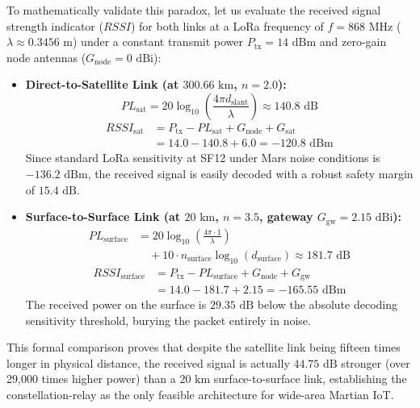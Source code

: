 \documentclass[journal,10pt,doublecolumn]{IEEEtran}
\begin{document}
To mathematically validate this paradox, let us evaluate the received signal strength indicator ($RSSI$) for both links at a LoRa frequency of $f = 868\text{ MHz}$ ($\lambda \approx 0.3456\text{ m}$) under a constant transmit power $P_{\text{tx}} = 14\text{ dBm}$ and zero-gain node antennas ($G_{\text{node}} = 0\text{ dBi}$):
\begin{itemize}
    \item \textbf{Direct-to-Satellite Link (at $300.66\text{ km}$, $n=2.0$):}
    \begin{equation}
        PL_{\text{sat}} = 20\log_{10}\left(\frac{4\pi d_{\text{slant}}}{\lambda}\right) \approx 140.8\text{ dB}
    \end{equation}
    \begin{equation}
    \begin{split}
        RSSI_{\text{sat}} &= P_{\text{tx}} - PL_{\text{sat}} + G_{\text{node}} + G_{\text{sat}} \\
        &= 14.0 - 140.8 + 6.0 = -120.8\text{ dBm}
    \end{split}
    \end{equation}
    Since standard LoRa sensitivity at SF12 under Mars noise conditions is $-136.2\text{ dBm}$, the received signal is easily decoded with a robust safety margin of $15.4\text{ dB}$.
    \item \textbf{Surface-to-Surface Link (at $20\text{ km}$, $n=3.5$, gateway $G_{\text{gw}} = 2.15\text{ dBi}$):}
    \begin{equation}
    \begin{split}
        PL_{\text{surface}} &= 20\log_{10}\left(\frac{4\pi \cdot 1}{\lambda}\right) \\
        &\quad + 10 \cdot n_{\text{surface}} \log_{10}(d_{\text{surface}}) \approx 181.7\text{ dB}
    \end{split}
    \end{equation}
    \begin{equation}
    \begin{split}
        RSSI_{\text{surface}} &= P_{\text{tx}} - PL_{\text{surface}} + G_{\text{node}} + G_{\text{gw}} \\
        &= 14.0 - 181.7 + 2.15 = -165.55\text{ dBm}
    \end{split}
    \end{equation}
    The received power on the surface is $29.35\text{ dB}$ below the absolute decoding sensitivity threshold, burying the packet entirely in noise.
\end{itemize}
This formal comparison proves that despite the satellite link being fifteen times longer in physical distance, the received signal is actually $44.75\text{ dB}$ stronger (over 29,000 times higher power) than a $20\text{ km}$ surface-to-surface link, establishing the constellation-relay as the only feasible architecture for wide-area Martian IoT.
\end{document}
